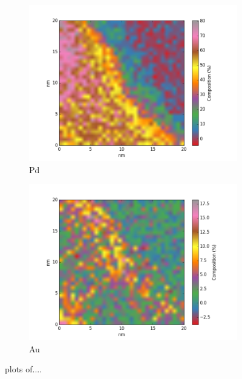 \begin{figure}
\begin{subfigure}{0.45\textwidth}
		\includegraphics[width=\textwidth]{fig/q-new/D/oldzeta/Pd_zeta}
		\caption{Pd}
		\label{fig:Dpd}
	\end{subfigure}%
\hfill
	\begin{subfigure}{0.45\textwidth}
		\includegraphics[width=\textwidth]{fig/q-new/D/oldzeta-Au/Au_zeta}
		\caption{Au}
		\label{fig:Dau}
	\end{subfigure}
	\caption{plots of....}
	\label{fig:D}
\end{figure}

